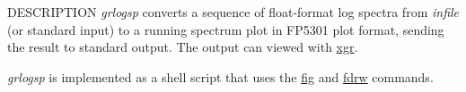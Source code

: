 \begin{synopsis}
\item[grlogsp] [ --t ] [ --O $O$ ] [ --x $X$ ] [ --y $ymin$ ] [ --yy $YY$ ]
	       [ --yo $YO$ ] [ --p $P$ ] 
\item[\ ~~~~~~~~] [ --ln $LN$ ] [ --s $S$ ] [ --e $E$ ] [ --n $N$ ] [ --l $L$ ] 
\item[\ ~~~~~~~~] [ --c $comment1$ ] [ --c2 $comment2$ ] [ --c3 $comment3$ ]
		  [ {\em infile} ]
\end{synopsis}

\begin{qsection}{DESCRIPTION}
{\em grlogsp} converts a sequence of float-format log spectra 
from {\em infile} (or standard input) 
to a running spectrum plot in FP5301 plot format,
sending the result to standard output. 
The output can viewed with \hyperlink{xgr}{xgr}.

{\em grlogsp} is implemented as a shell script 
that uses the \hyperlink{fig}{fig} and \hyperlink{fdrw}{fdrw} commands.
\end{qsection}

